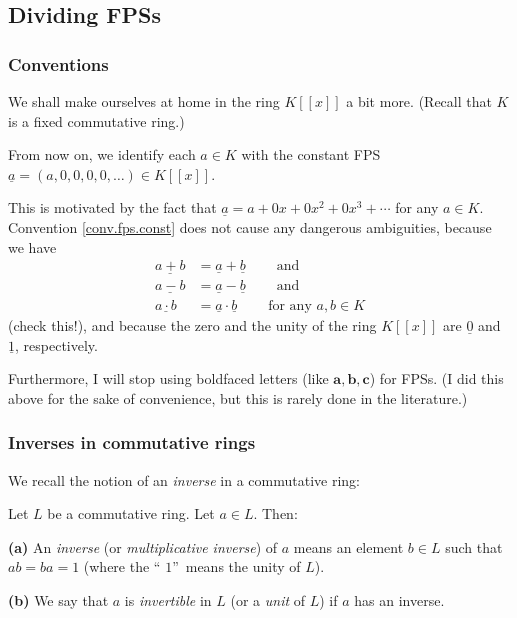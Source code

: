 \subsection{Dividing FPSs}

\subsubsection{Conventions}

We shall make ourselves at home in the ring $K\left[  \left[  x\right]
\right]  $ a bit more. (Recall that $K$ is a fixed commutative ring.)

\begin{convention}
\label{conv.fps.const}From now on, we identify each $a\in K$ with the constant
FPS $\underline{a}=\left(  a,0,0,0,0,\ldots\right)  \in K\left[  \left[
x\right]  \right]  $.
\end{convention}

This is motivated by the fact that $\underline{a}=a+0x+0x^{2}+0x^{3}+\cdots$
for any $a\in K$. Convention \ref{conv.fps.const} does not cause any dangerous
ambiguities, because we have%
\begin{align*}
\underline{a+b}  &  =\underline{a}+\underline{b}\ \ \ \ \ \ \ \ \ \ \text{and}%
\\
\underline{a-b}  &  =\underline{a}-\underline{b}\ \ \ \ \ \ \ \ \ \ \text{and}%
\\
\underline{a\cdot b}  &  =\underline{a}\cdot\underline{b}%
\ \ \ \ \ \ \ \ \ \ \text{for any }a,b\in K
\end{align*}
(check this!), and because the zero and the unity of the ring $K\left[
\left[  x\right]  \right]  $ are $\underline{0}$ and $\underline{1}$, respectively.

Furthermore, I will stop using boldfaced letters (like $\mathbf{a}%
,\mathbf{b},\mathbf{c}$) for FPSs. (I did this above for the sake of
convenience, but this is rarely done in the literature.)

\subsubsection{Inverses in commutative rings}

We recall the notion of an \emph{inverse} in a commutative ring:

\begin{definition}
\label{def.commring.inverse}Let $L$ be a commutative ring. Let $a\in L$. Then:
\medskip

\textbf{(a)} An \emph{inverse} (or \emph{multiplicative inverse}) of $a$ means
an element $b\in L$ such that $ab=ba=1$ (where the \textquotedblleft%
$1$\textquotedblright\ means the unity of $L$). \medskip

\textbf{(b)} We say that $a$ is \emph{invertible} in $L$ (or a \emph{unit} of
$L$) if $a$ has an inverse.
\end{definition}

